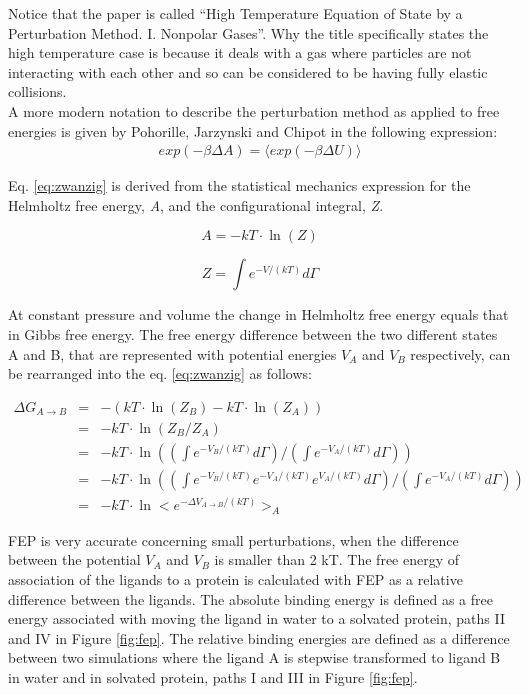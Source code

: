 \documentclass[10pt,oneside,pdftex]{article}
\begin{document}
Notice that the  paper is called ``High Temperature  Equation of State
by  a  Perturbation  Method.  I.   Nonpolar  Gases''.  Why  the  title
specifically states the high temperature case is because it deals with
a gas where  particles are not interacting with each  other and so can
be considered to be having fully elastic collisions.\\

A more modern notation to  describe the perturbation method as applied
to   free   energies   is    given   by   Pohorille,   Jarzynski   and
Chipot\cite{pohorille2010} in the following expression:
\begin{gather}
exp(-\beta\Delta A)= \langle exp(-\beta\Delta U) \rangle
\end{gather}

\noindent  Eq.   \ref{eq:zwanzig}  is  derived  from   the  statistical
mechanics expression for the Helmholtz free energy, \textit{A}, and the
configurational integral, \textit {Z}.

\begin{equation}
\label{eq:s.m.h.}
  A=-kT \cdot \ln(Z)
\end{equation}

\begin{equation}
\label{eq:conf}
  Z=\int e^{-V/(kT)} d \Gamma
\end{equation}

\noindent At constant pressure and volume the change in Helmholtz free
energy equals  that in Gibbs  free energy. The free  energy difference
between the  two different states A  and B, that are  represented with
potential  energies $V_A$  and $V_B$  respectively, can  be rearranged
into the eq.  \ref{eq:zwanzig} as follows:


\begin{eqnarray}
  \nonumber \Delta G_{A \rightarrow B}&=&-(kT \cdot \ln(Z_B)-kT \cdot \ln(Z_A))\\
  \nonumber &=& -kT \cdot \ln(Z_B/Z_A)\\
             &=& -kT \cdot \ln((\int e^{-V_B/(kT)} d \Gamma)/(\int e^{-V_A/(kT)} d \Gamma))\\
  \nonumber &=& -kT \cdot \ln((\int e^{-V_B/(kT)}e^{-V_A/(kT)}e^{V_A/(kT)} d \Gamma)/(\int e^{-V_A/(kT)} d \Gamma))\\
  \nonumber &=& -kT \cdot \ln<e^{-\Delta V_{A \rightarrow B}/(kT)}>_A
\end{eqnarray}

FEP  is  very  accurate   concerning  small  perturbations,  when  the
difference  between the  potential  $V_A$ and  $V_B$  is smaller  than
2 kT. The  free energy of  association of the  ligands to a  protein is
calculated with FEP as a relative difference between the ligands.  The
absolute binding  energy is defined  as a free energy  associated with
moving the ligand in  water to a solvated protein, paths  II and IV in
Figure \ref{fig:fep}. The  relative binding energies are  defined as a
difference  between two  simulations where  the ligand  A is  stepwise
transformed to ligand B in water  and in solvated protein, paths I and
III in Figure \ref{fig:fep}.
\end{document}
